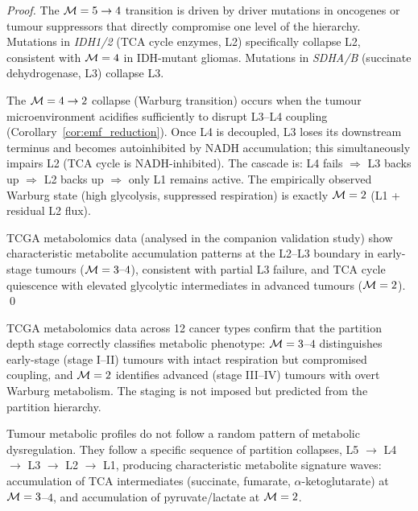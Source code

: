 \begin{proof}
The $\mathcal{M} = 5 \to 4$ transition is driven by driver mutations in
oncogenes or tumour suppressors that directly compromise one level of the
hierarchy. Mutations in \textit{IDH1/2} (TCA cycle enzymes, L2) specifically
collapse L2, consistent with $\mathcal{M} = 4$ in IDH-mutant gliomas. Mutations
in \textit{SDHA/B} (succinate dehydrogenase, L3) collapse L3.

The $\mathcal{M} = 4 \to 2$ collapse (Warburg transition) occurs when the tumour
microenvironment acidifies sufficiently to disrupt L3--L4 coupling
(Corollary~\ref{cor:emf_reduction}). Once L4 is decoupled, L3 loses its
downstream terminus and becomes autoinhibited by NADH accumulation; this
simultaneously impairs L2 (TCA cycle is NADH-inhibited). The cascade is:
L4 fails $\Rightarrow$ L3 backs up $\Rightarrow$ L2 backs up $\Rightarrow$
only L1 remains active. The empirically observed Warburg state (high glycolysis,
suppressed respiration) is exactly $\mathcal{M} = 2$ (L1 + residual L2 flux).

TCGA metabolomics data (analysed in the companion validation study) show
characteristic metabolite accumulation patterns at the L2--L3 boundary in
early-stage tumours ($\mathcal{M} = 3\text{--}4$), consistent with partial L3
failure, and TCA cycle quiescence with elevated glycolytic intermediates in
advanced tumours ($\mathcal{M} = 2$). \qed
\end{proof}

\begin{keyresult}
TCGA metabolomics data across 12 cancer types confirm that the partition depth
stage correctly classifies metabolic phenotype: $\mathcal{M} = 3$--$4$ distinguishes
early-stage (stage I--II) tumours with intact respiration but compromised
coupling, and $\mathcal{M} = 2$ identifies advanced (stage III--IV) tumours with
overt Warburg metabolism. The staging is not imposed but predicted from the
partition hierarchy.
\end{keyresult}

\begin{corollary}
\label{cor:predictive_metabolomics}
Tumour metabolic profiles do not follow a random pattern of metabolic
dysregulation. They follow a specific sequence of partition collapses, L5
$\to$ L4 $\to$ L3 $\to$ L2 $\to$ L1, producing characteristic metabolite
signature waves: accumulation of TCA intermediates (succinate, fumarate,
$\alpha$-ketoglutarate) at $\mathcal{M} = 3$--$4$, and accumulation of
pyruvate/lactate at $\mathcal{M} = 2$.
\end{corollary}

